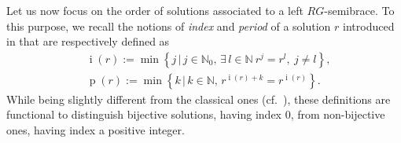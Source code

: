 \documentclass[11pt]{amsart}
\DeclareMathOperator{\ind}{i}
\DeclareMathOperator{\per}{p}
\newcommand{\indd}[1]{\ind{#1}}
\newcommand{\perr}[1]{\per{#1}}
\theoremstyle{definition}
\begin{document}
\smallskip



Let us now focus on the order of solutions associated to a left $RG$-semibrace. To this purpose, we recall the notions of \emph{index} and \emph{period} of a solution $r$ introduced in \cite{CCSt20-2} that are respectively defined as 
\begin{align*}
    &\indd{\left(r\right)}
    :=\min\left\{\left.j \,\right|\, j\in\mathbb{N}_0, \, \exists \, l\in \mathbb{N}\ r^j=r^l , \ j\neq l\right\},\\
    &\perr{\left(r\right)}
    :=\min\left\{\left.k\,\right| \, k\in\mathbb{N}, \, r^{\indd{\left(r\right)}+k}=r^{\indd{\left(r\right)}}\right\}.
\end{align*}
While being slightly different from the classical ones (cf.~\cite[p.~10]{Ho95}), these definitions are functional to distinguish bijective solutions, having index $0$, from non-bijective ones, having index a positive integer.  
\end{document}

